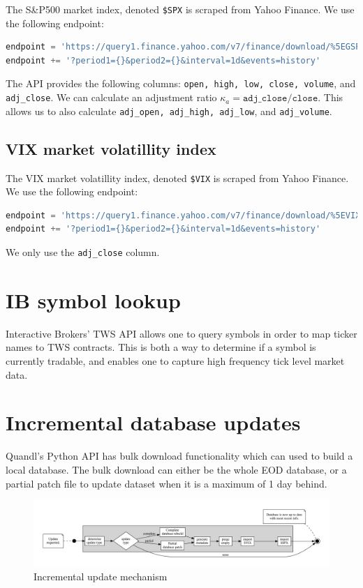 \documentclass[8pt,oneside]{book}
\begin{document}
The S\&P500 market index, denoted \texttt{\$SPX} is scraped from Yahoo Finance. We use the following endpoint:
\begin{lstlisting}[language=Python]
endpoint = 'https://query1.finance.yahoo.com/v7/finance/download/%5EGSPC'
endpoint += '?period1={}&period2={}&interval=1d&events=history'
\end{lstlisting}

The API provides the following columns: \texttt{open, high, low, close, volume}, and \texttt{adj\_close}.
We can calculate an adjustment ratio $\kappa_a = \mathtt{adj\_close} / \mathtt{close}$. This allows us to
also calculate \texttt{adj\_open, adj\_high, adj\_low}, and \texttt{adj\_volume}.


\subsection{VIX market volatillity index}

The VIX market volatillity index, denoted \texttt{\$VIX} is scraped from Yahoo Finance. We use the following endpoint:
\begin{lstlisting}[language=Python]
endpoint = 'https://query1.finance.yahoo.com/v7/finance/download/%5EVIX'
endpoint += '?period1={}&period2={}&interval=1d&events=history'
\end{lstlisting}

We only use the \texttt{adj\_close} column.

\section{IB symbol lookup}

Interactive Brokers' TWS API allows one to query symbols in order to map ticker names to TWS contracts. This
is both a way to determine if a symbol is currently tradable, and enables one to capture high frequency 
tick level market data.

\section{Incremental database updates}

Quandl's Python API has bulk download functionality which can used to build a local database. The bulk
download can either be the whole EOD database, or a partial patch file to update dataset when it is a maximum of
1 day behind.

\begin{figure}
    \center
    \caption{Incremental update mechanism}
    \includegraphics[scale=0.3]{update}
\end{figure}
\end{document}
